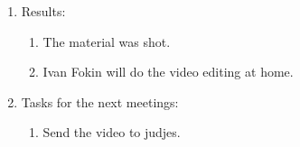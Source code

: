 \begin{enumerate}
\begin{enumerate}
	\end{enumerate}
	
	\item Results:
	\begin{enumerate}
		
		\item The material was shot.
		
		\item Ivan Fokin will do the video editing at home.
		
	\end{enumerate}
	
	\item Tasks for the next meetings:
	\begin{enumerate}
		
		\item Send the video to judjes.
			
	\end{enumerate}
\end{enumerate}
\fillpage
